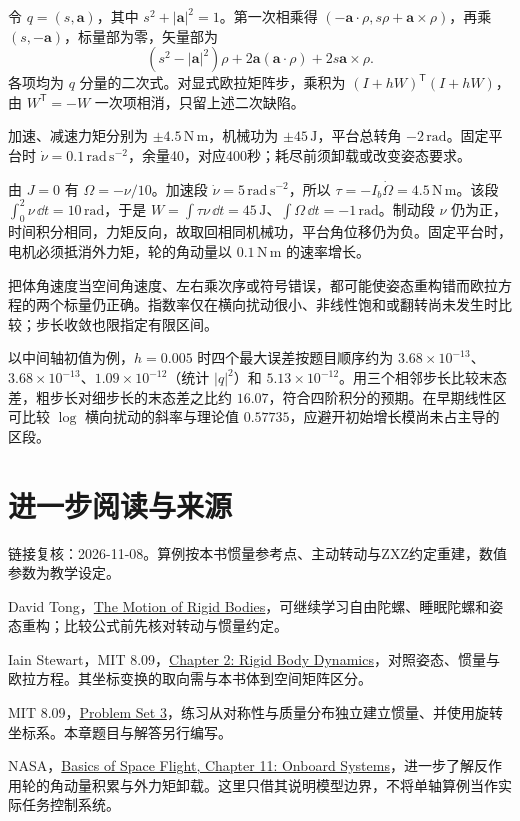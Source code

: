 \begin{bookexercises}
令 $q=(s,\boldsymbol a)$，其中 $s^2+|\boldsymbol a|^2=1$。第一次相乘得 $(-\boldsymbol a\cdot\rho,s\rho+\boldsymbol a\times\rho)$，再乘 $(s,-\boldsymbol a)$，标量部为零，矢量部为
\[
(s^2-|\boldsymbol a|^2)\rho+2\boldsymbol a(\boldsymbol a\cdot\rho)
+2s\boldsymbol a\times\rho.
\]
各项均为 $q$ 分量的二次式。对显式欧拉矩阵步，乘积为 $(I+hW)^{\mathsf T}(I+hW)$，由 $W^{\mathsf T}=-W$ 一次项相消，只留上述二次缺陷。
\item 加速、减速力矩分别为 $\pm4.5\,\mathrm{N\,m}$，机械功为 $\pm45\,\mathrm J$，平台总转角 $-2\,\mathrm{rad}$。固定平台时 $\dot\nu=0.1\,\mathrm{rad\,s^{-2}}$，余量40，对应400秒；耗尽前须卸载或改变姿态要求。

由 $J=0$ 有 $\Omega=-\nu/10$。加速段 $\dot\nu=5\,\mathrm{rad\,s^{-2}}$，所以 $\tau=-I_b\dot\Omega=4.5\,\mathrm{N\,m}$。该段 $\int_0^2 \nu\,\dd t=10\,\mathrm{rad}$，于是 $W=\int\tau\nu\,\dd t=45\,\mathrm J$、$\int\Omega\,\dd t=-1\,\mathrm{rad}$。制动段 $\nu$ 仍为正，时间积分相同，力矩反向，故取回相同机械功，平台角位移仍为负。固定平台时，电机必须抵消外力矩，轮的角动量以 $0.1\,\mathrm{N\,m}$ 的速率增长。
\item 把体角速度当空间角速度、左右乘次序或符号错误，都可能使姿态重构错而欧拉方程的两个标量仍正确。指数率仅在横向扰动很小、非线性饱和或翻转尚未发生时比较；步长收敛也限指定有限区间。

以中间轴初值为例，$h=0.005$ 时四个最大误差按题目顺序约为 $3.68\times10^{-13}$、$3.68\times10^{-13}$、$1.09\times10^{-12}$（统计 $|q|^2$）和 $5.13\times10^{-12}$。用三个相邻步长比较末态差，粗步长对细步长的末态差之比约 $16.07$，符合四阶积分的预期。在早期线性区可比较 $\log$ 横向扰动的斜率与理论值 $0.57735$，应避开初始增长模尚未占主导的区段。
\end{bookexercises}

\section*{进一步阅读与来源}
链接复核：2026-11-08。算例按本书惯量参考点、主动转动与ZXZ约定重建，数值参数为教学设定。
\begin{bookreading}
\item David Tong，\href{https://davidtong.org/pdfs/teaching/classical-dynamics/clas3.pdf}{The Motion of Rigid Bodies}，可继续学习自由陀螺、睡眠陀螺和姿态重构；比较公式前先核对转动与惯量约定。
\item Iain Stewart，MIT 8.09，\href{https://ocw.mit.edu/courses/8-09-classical-mechanics-iii-fall-2014/6fe39e8d5ce4ce746ca256dfea665eda_MIT8_09F14_Chapter_2.pdf}{Chapter 2: Rigid Body Dynamics}，对照姿态、惯量与欧拉方程。其坐标变换的取向需与本书体到空间矩阵区分。
\item MIT 8.09，\href{https://ocw.mit.edu/courses/8-09-classical-mechanics-iii-fall-2014/d5fdb8fec0febc6ba799cc86e67af3ee_MIT8_09F14_pset3.pdf}{Problem Set 3}，练习从对称性与质量分布独立建立惯量、并使用旋转坐标系。本章题目与解答另行编写。
\item NASA，\href{https://science.nasa.gov/learn/basics-of-space-flight/chapter11-2/}{Basics of Space Flight, Chapter 11: Onboard Systems}，进一步了解反作用轮的角动量积累与外力矩卸载。这里只借其说明模型边界，不将单轴算例当作实际任务控制系统。
\end{bookreading}

